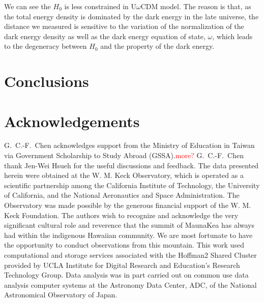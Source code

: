 \documentclass[useAMS,usenatbib]{mnras}
\newcommand\todo[1]{\textcolor{red}{#1}}
\newcommand{\Ddt}{D_{\Delta t}}
\begin{document}
We can see the $H_{0}$ is less constrained in U$\omega$CDM model. The reason is that, as the total energy density is dominated by the dark energy in the late universe, the distance we measured is sensitive to the variation of the normalization of the dark energy density as well as the dark energy equation of state, $\omega$, which leads to the degeneracy between $H_{0}$ and the property of the dark energy.




\section{Conclusions}
\label{sec:conclusion}

\section*{Acknowledgements}
G.~C.-F.~Chen acknowledges support from the Ministry of Education in Taiwan via Government Scholarship to Study Abroad (GSSA).\todo{more?} G.~C.-F.~Chen thank Jen-Wei Hsueh for the useful discussions and feedback. The data presented herein were obtained at the W. M. Keck Observatory, which is operated as a scientific partnership among the California Institute of Technology, the University of California, and the National Aeronautics and Space Administration. The Observatory was made possible by the generous financial support of the W. M. Keck Foundation. The authors wish to recognize and acknowledge the very significant cultural role and reverence that the summit of MaunaKea has always had within the indigenous Hawaiian community. We are most fortunate to have the opportunity to conduct observations from this mountain. This work used computational and storage services associated with the Hoffman2 Shared Cluster provided by UCLA Institute for Digital Research and Education’s Research Technology Group. Data analysis was in part carried out on common use data analysis computer systems at the Astronomy Data Center, ADC, of the National Astronomical Observatory of Japan. 
\end{document}
